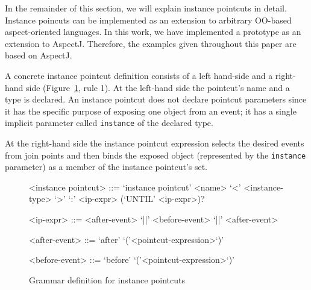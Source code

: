 \documentclass[10pt]{sigplanconf}
\newcommand{\lstinln}[1]{\lstinline~#1~}
\begin{document}
In the remainder of this section, we will explain instance pointcuts in detail. Instance poincuts can be implemented as an extension to arbitrary OO-based aspect-oriented languages. In this work, we have implemented a prototype as an extension to AspectJ. Therefore, the examples given throughout this paper are based on AspectJ.

A concrete instance pointcut definition consists of a left hand-side and a right-hand side (Figure~\ref{fig:grammar1}, rule 1).
At the left-hand side the pointcut's name and a type is declared.
An instance pointcut does not declare pointcut parameters since it has the specific purpose of exposing one object from an event; it has a single implicit parameter called \lstinln{instance} of the declared type.

At the right-hand side the instance pointcut expression selects the desired events from join points and then binds the exposed object (represented by the \lstinln{instance} parameter) as a member of the instance pointcut's set.

\begin{figure}[h!]
\begin{grammar}
<instance pointcut> ::= `instance pointcut' <name> `<' <instance-type> `>' `:'
<ip-expr> (`UNTIL' <ip-expr>)?

<ip-expr> ::= <after-event> `||' <before-event>  `||' <after-event>  

<after-event> ::= `after' `('<pointcut-expression>`)'

<before-event> ::= `before' `('<pointcut-expression>`)'
\end{grammar}
\caption{Grammar definition for instance pointcuts}
\label{fig:grammar1}
\end{figure}

\end{document}

